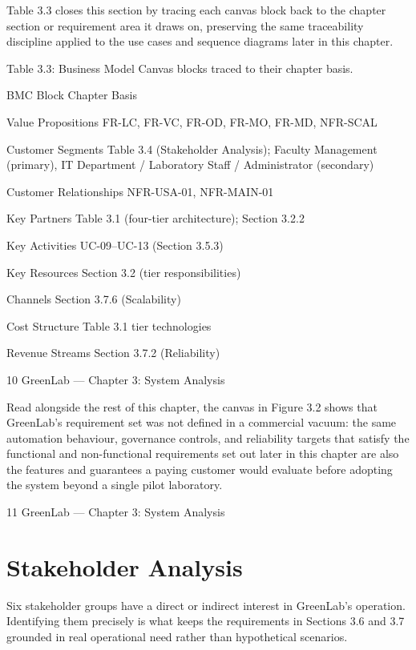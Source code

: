 Table 3.3 closes this section by tracing each canvas block back to the chapter section or
requirement area it draws on, preserving the same traceability discipline applied to the use cases
and sequence diagrams later in this chapter.

Table 3.3: Business Model Canvas blocks traced to their chapter basis.

BMC Block Chapter Basis

Value Propositions FR-LC, FR-VC, FR-OD, FR-MO, FR-MD, NFR-SCAL

Customer Segments Table 3.4 (Stakeholder Analysis); Faculty Management
(primary), IT Department / Laboratory Staff / Administrator
(secondary)

Customer Relationships NFR-USA-01, NFR-MAIN-01

Key Partners Table 3.1 (four-tier architecture); Section 3.2.2

Key Activities UC-09--UC-13 (Section 3.5.3)

Key Resources Section 3.2 (tier responsibilities)

Channels Section 3.7.6 (Scalability)

Cost Structure Table 3.1 tier technologies

Revenue Streams Section 3.7.2 (Reliability)



10
GreenLab --- Chapter 3: System Analysis


Read alongside the rest of this chapter, the canvas in Figure 3.2 shows that GreenLab's
requirement set was not defined in a commercial vacuum: the same automation behaviour,
governance controls, and reliability targets that satisfy the functional and non-functional
requirements set out later in this chapter are also the features and guarantees a paying customer
would evaluate before adopting the system beyond a single pilot laboratory.




11
GreenLab --- Chapter 3: System Analysis



\section{Stakeholder Analysis}

Six stakeholder groups have a direct or indirect interest in GreenLab's operation. Identifying them
precisely is what keeps the requirements in Sections 3.6 and 3.7 grounded in real operational need
rather than hypothetical scenarios.

